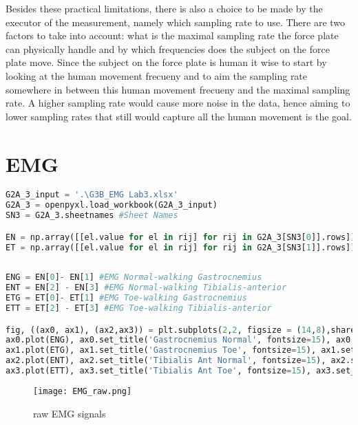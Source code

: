 \documentclass[english, a4paper, 11pt]{article}
\begin{document}
Besides these practical limitations, there is also a choice to be made by the executor of the measurement, namely which sampling rate to use.
There are two factors to take into account: what is the maximal sampling rate the force plate can physically handle and by which frequencies does the subject on the force plate move.
Since the subject on the force plate is human it wise to start by looking at the human movement frecueny and to aim the sampling rate 
somewhere in between this human movement frecueny and the maximal sampling rate. A higher sampling rate would cause more noise
in the data, hence aiming to lower sampling rates that still would capture all the human movement is the goal.

\section{EMG}

    \begin{lstlisting}[language=Python, caption=input EMG data]
G2A_3_input = '.\G3B_EMG Lab3.xlsx'
G2A_3 = openpyxl.load_workbook(G2A_3_input)
SN3 = G2A_3.sheetnames #Sheet Names

EN = np.array([[el.value for el in rij] for rij in G2A_3[SN3[0]].rows])[11:10951,2:].T #EMG Normal walking #10951
ET = np.array([[el.value for el in rij] for rij in G2A_3[SN3[1]].rows])[11:11891,2:].T #EMG Toe walking #11891
    
    \end{lstlisting}


    \begin{lstlisting}[language=Python, caption=raw EMG plotting]
ENG = EN[0]- EN[1] #EMG Normal-walking Gastrocnemius
ENT = EN[2] - EN[3] #EMG Normal-walking Tibialis-anterior
ETG = ET[0]- ET[1] #EMG Toe-walking Gastrocnemius
ETT = ET[2] - ET[3] #EMG Toe-walking Tibialis-anterior        

fig, ((ax0, ax1), (ax2,ax3)) = plt.subplots(2,2, figsize = (14,8),sharey=True)
ax0.plot(ENG), ax0.set_title('Gastrocnemius Normal', fontsize=15), ax0.set_xlim(0,10000), ax0.set_ylabel('Voltage [V]', fontsize=15)
ax1.plot(ETG), ax1.set_title('Gastrocnemius Toe', fontsize=15), ax1.set_xlim(0,10000)
ax2.plot(ENT), ax2.set_title('Tibialis Ant Normal', fontsize=15), ax2.set_xlim(0,10000), ax2.set_ylabel('Voltage [V]', fontsize=15)
ax3.plot(ETT), ax3.set_title('Tibialis Ant Toe', fontsize=15), ax3.set_xlim(0,10000)
    \end{lstlisting}

    \begin{figure}[!h]
        \centering
        \texttt{[image: EMG\_raw.png]}
        \caption{raw EMG signals}
        \label{fig:EMG_raw}
    \end{figure}
\end{document}
